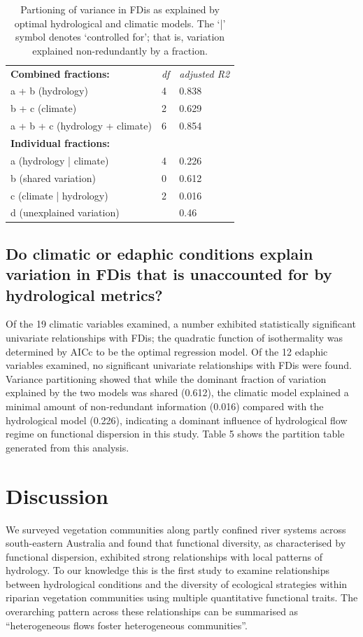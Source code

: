 \documentclass[openright,12pt,a4paper]{memoir}
\begin{document}
\begin{table}[ht]
\tiny
\centering
\caption[Partioning of variance in FDis as explained by optimal hydrological and climatic models.]{\small{Partioning of variance in FDis as explained by optimal hydrological and climatic models. The ‘|’ symbol denotes ‘controlled for’; that is, variation explained non-redundantly by a fraction.}}
\label{Ch3_T5}
{\tabulinesep=1.2mm
\begin{tabu}to 
\hline
\textbf{Combined fractions:}	& \textit{df}&	\textit{adjusted R2} \\
a + b (hydrology)&	4&	0.838 \\
b + c (climate)&	2&	0.629\\
a + b + c (hydrology + climate)&	6&	0.854\\
\hline
\textbf{Individual fractions:}& & 		\\
a (hydrology | climate)&	4&	0.226\\
b (shared variation)&	0&	0.612\\
c (climate | hydrology)&	2&	0.016\\
d (unexplained variation)& &		0.46\\
\hline
\end{tabu}}
\end{table}
\clearpage

\subsection{Do climatic or edaphic conditions explain variation in FDis that is unaccounted for by hydrological metrics?}
Of the 19 climatic variables examined, a number exhibited statistically significant univariate relationships with FDis; the quadratic function of isothermality was determined by AICc to be the optimal regression model. Of the 12 edaphic variables examined, no significant univariate relationships with FDis were found.  Variance partitioning showed that while the dominant fraction of variation explained by the two models was shared (0.612), the climatic model explained a minimal amount of non-redundant information (0.016) compared with the hydrological model (0.226), indicating a dominant influence of hydrological flow regime on functional dispersion in this study. Table 5 shows the partition table generated from this analysis.



\section{Discussion}
We surveyed vegetation communities along partly confined river systems across south-eastern Australia and found that functional diversity, as characterised by functional dispersion, exhibited strong relationships with local patterns of hydrology. To our knowledge this is the first study to examine relationships between hydrological conditions and the diversity of ecological strategies within riparian vegetation communities using multiple quantitative functional traits. The overarching pattern across these relationships can be summarised as “heterogeneous flows foster heterogeneous communities”.
\end{document}
